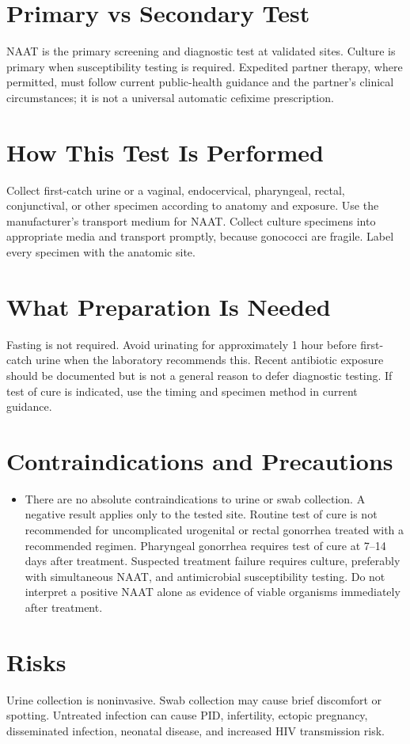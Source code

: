 \section*{Primary vs Secondary Test}
NAAT is the primary screening and diagnostic test at validated sites. Culture is primary when susceptibility testing is required. Expedited partner therapy, where permitted, must follow current public-health guidance and the partner's clinical circumstances; it is not a universal automatic cefixime prescription.

\section*{How This Test Is Performed}
Collect first-catch urine or a vaginal, endocervical, pharyngeal, rectal, conjunctival, or other specimen according to anatomy and exposure. Use the manufacturer's transport medium for NAAT. Collect culture specimens into appropriate media and transport promptly, because gonococci are fragile. Label every specimen with the anatomic site.

\section*{What Preparation Is Needed}
Fasting is not required. Avoid urinating for approximately 1 hour before first-catch urine when the laboratory recommends this. Recent antibiotic exposure should be documented but is not a general reason to defer diagnostic testing. If test of cure is indicated, use the timing and specimen method in current guidance.

\section*{Contraindications and Precautions}
\begin{itemize}
  \item There are no absolute contraindications to urine or swab collection. A negative result applies only to the tested site. Routine test of cure is not recommended for uncomplicated urogenital or rectal gonorrhea treated with a recommended regimen. Pharyngeal gonorrhea requires test of cure at 7--14 days after treatment. Suspected treatment failure requires culture, preferably with simultaneous NAAT, and antimicrobial susceptibility testing. Do not interpret a positive NAAT alone as evidence of viable organisms immediately after treatment.
\end{itemize}
\section*{Risks}
Urine collection is noninvasive. Swab collection may cause brief discomfort or spotting. Untreated infection can cause PID, infertility, ectopic pregnancy, disseminated infection, neonatal disease, and increased HIV transmission risk.

